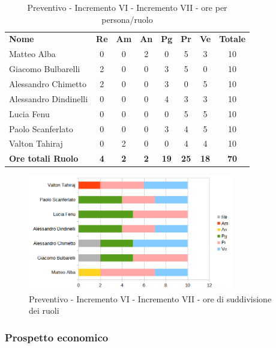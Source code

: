 \begin{table} [h!]
	\begin{center}
		\begin{tabular} { m{3.5cm} c c c c c c c }
			\rowcolor{lightgray}
			\textbf{Nome} & \textbf{Re} & \textbf{Am} & \textbf{An} & \textbf{Pg} & \textbf{Pr} & \textbf{Ve} & \textbf{Totale} \\
			Matteo Alba &0 &0 & 2& 0 &5 & 3 & 10 \\
			Giacomo Bulbarelli & 2&0 & 0& 3 & 5 & 0 & 10 \\
			Alessandro Chimetto & 2 & 0& 0& 3 & 0 & 5& 10 \\
			Alessandro Dindinelli & 0& 0 & 0& 4 & 3 &3 & 10 \\
			Lucia Fenu & 0 & 0 &0 & 0 & 5 & 5 & 10 \\
			Paolo Scanferlato &0 & 0 &0 & 3 & 4 & 5 & 10\\
			Valton Tahiraj & 0& 2 &0 & 0 & 4 & 4 & 10 \\
			\textbf{Ore totali Ruolo} & \textbf{4} & \textbf{2} & \textbf{2} & \textbf{19} & \textbf{25}& \textbf{18} & \textbf{70}
		\end{tabular}
		\caption{Preventivo - Incremento VI - Incremento VII - ore per persona/ruolo}
	\end{center}
\end{table}
\begin{figure} [h!]
	\centering
	\includegraphics[width=0.8\textwidth]{res/img/preventivi/6e7-barre.png}
	\caption{Preventivo - Incremento VI - Incremento VII - ore di suddivisione dei ruoli} 
\end{figure}

\newpage
\subsubsection{Prospetto economico}

